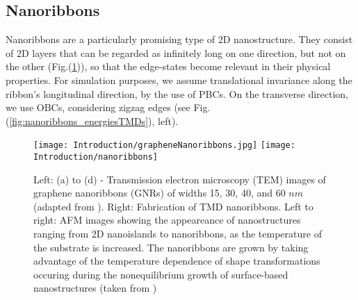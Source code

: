 \subsection{Nanoribbons}\label{subsec:nanoribbons}

Nanoribbons are a particularly promising type of \acs{2D} nanostructure.
They consist of \ac{2D} layers that can be regarded as infinitely long on one direction, but not on the other (Fig.(\ref{fig:graphNanoFabricationTMD})), so that the edge-states become relevant in their physical properties.
For simulation purposes, we assume translational invariance along the ribbon's longitudinal direction, by the use of \acp{PBC}.
On the transverse direction, we use \acp{OBC},  considering zigzag edges (see Fig.(\ref{fig:nanoribbons_energiesTMDs}), left).
\begin{figure}[H]
\texttt{[image: Introduction/grapheneNanoribbons.jpg]}
\texttt{[image: Introduction/nanoribbons]}
\caption[(TEM) images of graphene nanoribbons. Fabrication of \ac{TMD} nanoribbons.]{Left: (a) to (d) - Transmission electron microscopy (TEM) images of graphene nanoribbons (GNRs) of widths 15, 30, 40, and 60 $nm$ (adapted from \cite{mohanty_nanotomy-based_2012}). Right: Fabrication of \ac{TMD} nanoribbons. Left to right: \ac{AFM} images showing the appeareance of nanostructures ranging from \ac{2D} nanoislands to nanoribbons, as the temperature of the substrate is increased. The nanoribbons are grown by taking advantage of the temperature dependence of shape transformations occuring during the nonequilibrium growth of surface-based nanostructures (taken from \cite{chen_fabrication_2017})}
\label{fig:graphNanoFabricationTMD}
\end{figure}

